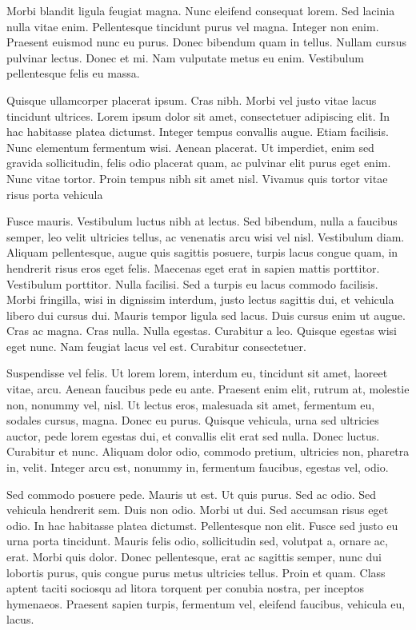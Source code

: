 \documentclass{article}
\begin{document}
Morbi blandit ligula feugiat magna. Nunc eleifend consequat lorem. Sed lacinia
nulla vitae enim. Pellentesque tincidunt purus vel magna. Integer non enim.
Praesent euismod nunc eu purus. Donec bibendum quam in tellus. Nullam cursus pulvinar lectus. Donec et mi. Nam vulputate metus eu enim. Vestibulum
pellentesque felis eu massa.
\par
Quisque ullamcorper placerat ipsum. Cras nibh. Morbi vel justo vitae lacus
tincidunt ultrices. Lorem ipsum dolor sit amet, consectetuer adipiscing elit. In
hac habitasse platea dictumst. Integer tempus convallis augue. Etiam facilisis.
Nunc elementum fermentum wisi. Aenean placerat. Ut imperdiet, enim sed
gravida sollicitudin, felis odio placerat quam, ac pulvinar elit purus eget enim.
Nunc vitae tortor. Proin tempus nibh sit amet nisl. Vivamus quis tortor vitae
risus porta vehicula
\par
Fusce mauris. Vestibulum luctus nibh at lectus. Sed bibendum, nulla a faucibus semper, leo velit ultricies tellus, ac venenatis arcu wisi vel nisl. Vestibulum
diam. Aliquam pellentesque, augue quis sagittis posuere, turpis lacus congue
quam, in hendrerit risus eros eget felis. Maecenas eget erat in sapien mattis
porttitor. Vestibulum porttitor. Nulla facilisi. Sed a turpis eu lacus commodo facilisis. Morbi fringilla, wisi in dignissim interdum, justo lectus sagittis dui, et
vehicula libero dui cursus dui. Mauris tempor ligula sed lacus. Duis cursus enim
ut augue. Cras ac magna. Cras nulla. Nulla egestas. Curabitur a leo. Quisque
egestas wisi eget nunc. Nam feugiat lacus vel est. Curabitur consectetuer.
\par
Suspendisse vel felis. Ut lorem lorem, interdum eu, tincidunt sit amet, laoreet vitae, arcu. Aenean faucibus pede eu ante. Praesent enim elit, rutrum at,
molestie non, nonummy vel, nisl. Ut lectus eros, malesuada sit amet, fermentum
eu, sodales cursus, magna. Donec eu purus. Quisque vehicula, urna sed ultricies
auctor, pede lorem egestas dui, et convallis elit erat sed nulla. Donec luctus.
Curabitur et nunc. Aliquam dolor odio, commodo pretium, ultricies non, pharetra in, velit. Integer arcu est, nonummy in, fermentum faucibus, egestas vel,
odio.
\par
Sed commodo posuere pede. Mauris ut est. Ut quis purus. Sed ac odio. Sed
vehicula hendrerit sem. Duis non odio. Morbi ut dui. Sed accumsan risus eget
odio. In hac habitasse platea dictumst. Pellentesque non elit. Fusce sed justo
eu urna porta tincidunt. Mauris felis odio, sollicitudin sed, volutpat a, ornare
ac, erat. Morbi quis dolor. Donec pellentesque, erat ac sagittis semper, nunc
dui lobortis purus, quis congue purus metus ultricies tellus. Proin et quam.
Class aptent taciti sociosqu ad litora torquent per conubia nostra, per inceptos
hymenaeos. Praesent sapien turpis, fermentum vel, eleifend faucibus, vehicula
eu, lacus.
\end{document}
